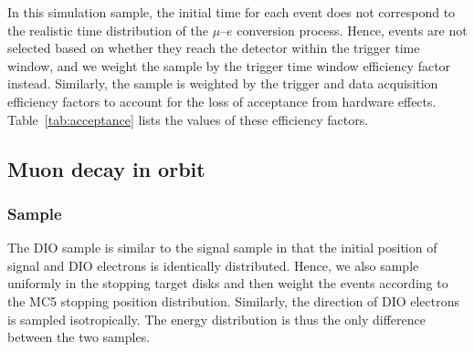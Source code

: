 In this simulation sample, the initial time for each event does not correspond
to the realistic time distribution of the $\mu$--$e$ conversion process. Hence,
events are not selected based on whether they reach the detector within the
trigger time window, and we weight the sample by the trigger time window
efficiency factor instead. Similarly, the sample is weighted by the trigger and
data acquisition efficiency factors to account for the loss of acceptance from
hardware effects. Table~\ref{tab:acceptance} lists the values of these
efficiency factors.


\subsection{Muon decay in orbit}
\subsubsection{Sample}
The DIO sample is similar to the signal sample in that the initial position
of signal and DIO electrons is identically distributed. Hence, we also sample
uniformly in the stopping target disks and then weight the events according to
the MC5 stopping position distribution. Similarly, the direction of DIO
electrons is sampled isotropically. The energy distribution is thus the only
difference between the two samples. 

